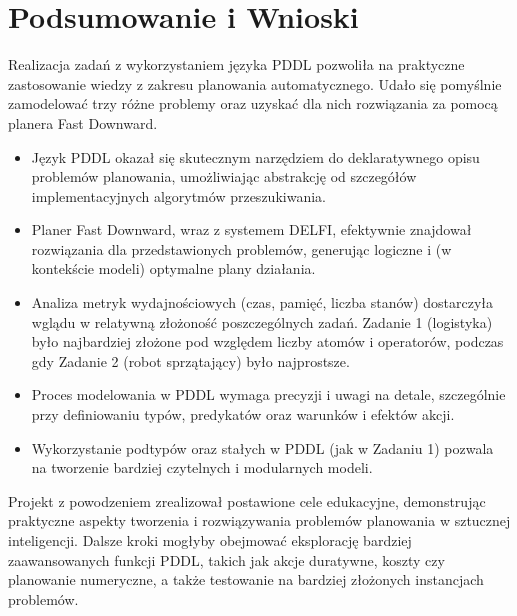 \documentclass[12pt,a4paper]{article}
\begin{document}
\section{Podsumowanie i Wnioski}
Realizacja zadań z wykorzystaniem języka PDDL pozwoliła na praktyczne zastosowanie wiedzy z zakresu planowania automatycznego. Udało się pomyślnie zamodelować trzy różne problemy oraz uzyskać dla nich rozwiązania za pomocą planera Fast Downward.
\begin{itemize}
    \item Język PDDL okazał się skutecznym narzędziem do deklaratywnego opisu problemów planowania, umożliwiając abstrakcję od szczegółów implementacyjnych algorytmów przeszukiwania.
    \item Planer Fast Downward, wraz z systemem DELFI, efektywnie znajdował rozwiązania dla przedstawionych problemów, generując logiczne i (w kontekście modeli) optymalne plany działania.
    \item Analiza metryk wydajnościowych (czas, pamięć, liczba stanów) dostarczyła wglądu w relatywną złożoność poszczególnych zadań. Zadanie 1 (logistyka) było najbardziej złożone pod względem liczby atomów i operatorów, podczas gdy Zadanie 2 (robot sprzątający) było najprostsze.
    \item Proces modelowania w PDDL wymaga precyzji i uwagi na detale, szczególnie przy definiowaniu typów, predykatów oraz warunków i efektów akcji.
    \item Wykorzystanie podtypów oraz stałych w PDDL (jak w Zadaniu 1) pozwala na tworzenie bardziej czytelnych i modularnych modeli.
\end{itemize}
Projekt z powodzeniem zrealizował postawione cele edukacyjne, demonstrując praktyczne aspekty tworzenia i rozwiązywania problemów planowania w sztucznej inteligencji. Dalsze kroki mogłyby obejmować eksplorację bardziej zaawansowanych funkcji PDDL, takich jak akcje duratywne, koszty czy planowanie numeryczne, a także testowanie na bardziej złożonych instancjach problemów.
\end{document}
